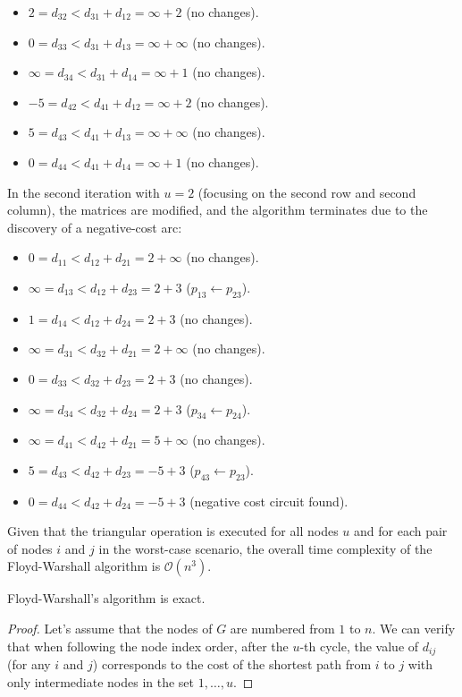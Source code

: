 \begin{example}
\begin{itemize}
        \item $2=d_{32} < d_{31} + d_{12} = \infty + 2$ (no changes). 
        \item $0=d_{33} < d_{31} + d_{13} = \infty + \infty$ (no changes). 
        \item $\infty=d_{34} < d_{31} + d_{14} = \infty + 1$ (no changes). 
        \item $-5=d_{42} < d_{41} + d_{12} = \infty + 2$ (no changes). 
        \item $5=d_{43} < d_{41} + d_{13} = \infty + \infty$ (no changes). 
        \item $0=d_{44} < d_{41} + d_{14} = \infty + 1$ (no changes). 
    \end{itemize}
    In the second iteration with $u=2$ (focusing on the second row and second column), the matrices are modified, and the algorithm terminates due to the discovery of a negative-cost arc:
    \begin{itemize}
        \item $0=d_{11} < d_{12} + d_{21} = 2 +\infty $ (no changes). 
        \item $\infty=d_{13} < d_{12} + d_{23} = 2+3$ ($p_{13} \leftarrow p_{23}$). 
        \item $1=d_{14} < d_{12} + d_{24} = 2+3$ (no changes). 
        \item $\infty=d_{31} < d_{32} + d_{21} = 2 + \infty$ (no changes). 
        \item $0=d_{33} < d_{32} + d_{23} = 2+3$ (no changes). 
        \item $\infty=d_{34} < d_{32} + d_{24} = 2+3$ ($p_{34} \leftarrow p_{24}$). 
        \item $\infty=d_{41} < d_{42} + d_{21} = 5 + \infty$ (no changes). 
        \item $5=d_{43} < d_{42} + d_{23} = -5+3$ ($p_{43} \leftarrow p_{23}$). 
        \item $0=d_{44} < d_{42} + d_{24} = -5+3$ (negative cost circuit found). 
    \end{itemize}
\end{example}
Given that the triangular operation is executed for all nodes $u$ and for each pair of nodes $i$ and $j$ in the worst-case scenario, the overall time complexity of the Floyd-Warshall algorithm is $\mathcal{O}(n^3)$.
\begin{proposition}
    Floyd-Warshall's algorithm is exact. 
\end{proposition}
\begin{proof}
    Let's assume that the nodes of $G$ are numbered from $1$ to $n$. 
    We can verify that when following the node index order, after the $u$-th cycle, the value of $d_{ij}$ (for any $i$ and $j$) corresponds to the cost of the shortest path from $i$ to $j$ with only intermediate nodes in the set ${1,\dots,u}$. 
\end{proof}

